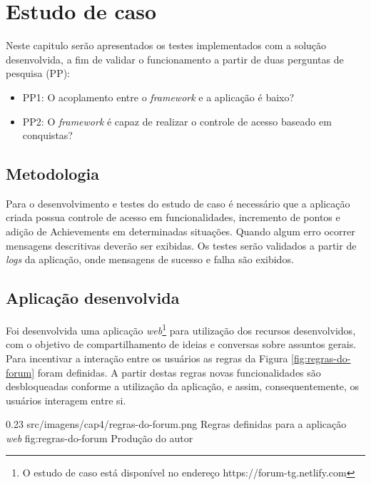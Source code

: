 \newpage
\chapter{Estudo de caso}

\par Neste capitulo serão apresentados os testes implementados com a solução desenvolvida, a fim de validar o funcionamento a partir de duas perguntas de pesquisa (PP):

\begin{itemize}
    \item PP1: O acoplamento entre o \textit{framework} e a aplicação é baixo?
    \item PP2: O \textit{framework} é capaz de realizar o controle de acesso baseado em conquistas?
\end{itemize}

\section{Metodologia}

\par Para o desenvolvimento e testes do estudo de caso é necessário que a aplicação criada possua controle de acesso em funcionalidades, incremento de pontos e adição de Achievements em determinadas situações. Quando algum erro ocorrer mensagens descritivas deverão ser exibidas. Os testes serão validados a partir de \textit{logs} da aplicação, onde mensagens de sucesso e falha são exibidos. %

\section{Aplicação desenvolvida}

\par Foi desenvolvida uma aplicação \textit{web}\footnote{O estudo de caso está disponível no endereço https://forum-tg.netlify.com} para utilização dos recursos desenvolvidos, com o objetivo de compartilhamento de ideias e conversas sobre assuntos gerais. Para incentivar a interação entre os usuários as regras da Figura \ref{fig:regras-do-forum} foram definidas. A partir destas regras novas funcionalidades são desbloqueadas conforme a utilização da aplicação, e assim, consequentemente, os usuários interagem entre si.

\begin{image}
{0.23}
{src/imagens/cap4/regras-do-forum.png}
{Regras definidas para a aplicação \textit{web}}
{fig:regras-do-forum}
{Produção do autor}
\end{image}

